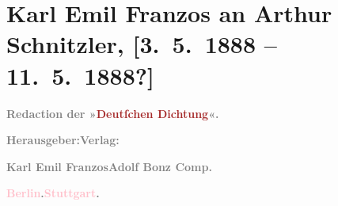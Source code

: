 

\renewcommand{\erwaehntePersonen}{Personen: Karl Emil Franzos, Ottilie Franzos, Johann Schnitzler}
\renewcommand{\erwaehnteInstitutionen}{Institutionen: Adolf Bonz {\kaufmannsund}  Comp., Deutsche Dichtung}
\renewcommand{\erwaehnteOrte}{Orte: Berlin, Kaiserin-Augusta-Straße 71, Stuttgart, Wien}
\renewcommand{\erwaehnteWerke}{Werke: Amerika, Erbschaft, Jugend in Wien, Mein Freund Ypsilon. Aus den Papieren eines Arztes}
\section[Karl Emil Franzos an Arthur Schnitzler, {[}3. 5. 1888 – 11. 5. 1888?{]}]{Karl Emil Franzos an Arthur Schnitzler, {[}3. 5. 1888 –
               11. 5. 1888?{]}}
\nopagebreak{}
\rehead{ }\normalsize\beginnumbering{}
\toendnotes[C]{\smallbreak\pagebreak[2]}
\toendnotes[C]{\smallbreak}
\pstart
           \centering{}{\pb}\textcolor{gray}{\textbf{Redaction der »\textcolor{brown}{Deutſchen
                        Dichtung}{}\ledrightnote{\textcolor{brown}{Deutsche Dichtung}}«.}}\pend
           
\pstart
           \textcolor{gray}{\textbf{Herausgeber:}}\hfill \textcolor{gray}{\textbf{Verlag:}}\pend
           
\pstart
           \textcolor{blue}{\textcolor{gray}{\textbf{Karl Emil Franzos}}}{}\ledrightnote{\textcolor{blue}{Karl Emil Franzos}}\hfill \textcolor{brown}{\textcolor{gray}{\textbf{Adolf Bonz {\kaufmannsund} Comp.}}}{}\pend
           
\pstart
           \textcolor{gray}{\textbf{\textcolor{pink}{Berlin}{}\ledrightnote{\textcolor{pink}{Berlin}}.}}\hfill \textcolor{gray}{\textbf{\textcolor{pink}{Stuttgart}{}\ledrightnote{\textcolor{pink}{Stuttgart}}.}}\pend
           
